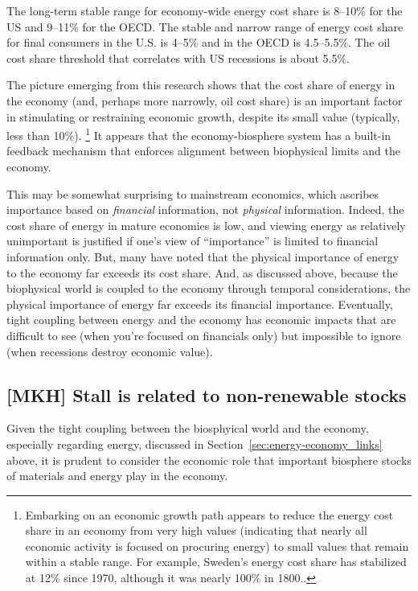 The long-term stable range for economy-wide energy cost share 
is 8--10\% for the US and 9--11\% for the OECD. 
The stable and narrow range of energy cost share 
for final consumers in the U.S. is 4--5\% and in the OECD is 4.5--5.5\%.
The oil cost share threshold that correlates with US recessions 
is about 5.5\%.\cite{Murphy:2011jh}

The picture emerging from this research shows that 
the cost share of energy in the economy
(and, perhaps more narrowly, oil cost share)
is an important factor in stimulating or restraining economic growth,
despite its small value (typically, less than 10\%).%
	\footnote{
	Embarking on an economic growth path
	appears to reduce the energy cost share in an economy from very high values
	(indicating that nearly all economic activity is focused on procuring energy)
	to small values that remain within a stable range.
	For example, Sweden's energy cost share has stabilized at 12\% since 1970,
	although it was nearly 100\% in 1800.\cite{Stern:2012ey}.
	}
It appears that the economy-biosphere system has 
a built-in feedback mechanism that 
enforces alignment between biophysical limits and the economy.

This may be somewhat surprising to mainstream economics, 
which ascribes importance 
based on \emph{financial} information, 
not \emph{physical} information. 
Indeed, the cost share of energy in mature economies is low, 
and viewing energy as relatively unimportant is justified if
one's view of ``importance'' is limited to financial information only.
But, many have noted that the physical importance of energy to the economy 
far exceeds its cost share.\cite{Ayres:2013aa}
And, as discussed above, because the biophysical world is coupled 
to the economy through temporal considerations, 
the physical importance of energy far exceeds its financial importance.
Eventually, tight coupling between energy and the economy 
has economic impacts that are difficult to see (when you're focused on financials only)
but impossible to ignore (when recessions destroy economic value).


\subsection{[MKH] Stall is related to non-renewable stocks}
\label{sec:stall_non-renewable_stocks}

Given the tight coupling between the biosphyical world and the economy,
especially regarding energy,
discussed in Section~\ref{sec:energy-economy_links} above,
it is prudent to consider the economic role that important biosphere stocks
of materials and energy play in the economy.

